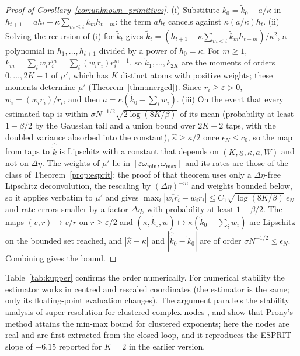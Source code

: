 \documentclass[12pt]{article}
\theoremstyle{definition}
\theoremstyle{remark}
\begin{document}
\begin{proof}[Proof of Corollary~\ref{cor:unknown_primitives}]
(i) Substitute $k_0=\tilde k_0-a/\kappa$ in $h_{t+1}=ah_t+\kappa\sum_{m\le t}k_mh_{t-m}$: the term $ah_t$ cancels against $\kappa(a/\kappa)h_t$. (ii) Solving the recursion of (i) for $\tilde k_t$ gives $\tilde k_t=(h_{t+1}-\kappa\sum_{m<t}\tilde k_mh_{t-m})/\kappa^2$, a polynomial in $h_1,\ldots,h_{t+1}$ divided by a power of $h_0=\kappa$. For $m\ge1$, $\tilde k_m=\sum_iw_ir_i^m=\sum_i(w_ir_i)r_i^{m-1}$, so $\tilde k_1,\ldots,\tilde k_{2K}$ are the moments of orders $0,\ldots,2K-1$ of $\mu'$, which has $K$ distinct atoms with positive weights; these moments determine $\mu'$ (Theorem~\ref{thm:merged}). Since $r_i\ge\varepsilon>0$, $w_i=(w_ir_i)/r_i$, and then $a=\kappa(\tilde k_0-\sum_iw_i)$. (iii) On the event that every estimated tap is within $\sigma N^{-1/2}\sqrt{2\log(8K/\beta)}$ of its mean (probability at least $1-\beta/2$ by the Gaussian tail and a union bound over $2K+2$ taps, with the doubled variance absorbed into the constant), $\hat\kappa\ge\underline\kappa/2$ once $\epsilon_N\le c_0$, so the map from taps to $\hat{\tilde k}$ is Lipschitz with a constant that depends on $(K,\underline\kappa,\overline\kappa,\bar a,W)$ and not on $\Delta\eta$. The weights of $\mu'$ lie in $[\varepsilon\omega_{\min},\omega_{\max}]$ and its rates are those of the class of Theorem~\ref{prop:esprit}; the proof of that theorem uses only a $\Delta\eta$-free Lipschitz deconvolution, the rescaling by $(\Delta\eta)^{-m}$ and weights bounded below, so it applies verbatim to $\mu'$ and gives $\max_i|\widehat{w_ir_i}-w_ir_i|\le C_1\sqrt{\log(8K/\beta)}\,\epsilon_N$ and rate errors smaller by a factor $\Delta\eta$, with probability at least $1-\beta/2$. The maps $(v,r)\mapsto v/r$ on $r\ge\varepsilon/2$ and $(\kappa,\tilde k_0,w)\mapsto\kappa(\tilde k_0-\sum_iw_i)$ are Lipschitz on the bounded set reached, and $|\hat\kappa-\kappa|$ and $|\hat{\tilde k}_0-\tilde k_0|$ are of order $\sigma N^{-1/2}\le\epsilon_N$. Combining gives the bound.
\end{proof}


Table~\ref{tab:kupper} confirms the order numerically. For numerical stability the estimator works in centred and rescaled coordinates (the estimator is the same; only its floating-point evaluation changes). The argument parallels the stability analysis of super-resolution for clustered complex nodes \citep{batenkov2021}, and \citet{katz2023} show that Prony's method attains the min-max bound for clustered exponents; here the nodes are real and are first extracted from the closed loop, and it reproduces the ESPRIT slope of $-6.15$ reported for $K=2$ in the earlier version.
\end{document}
